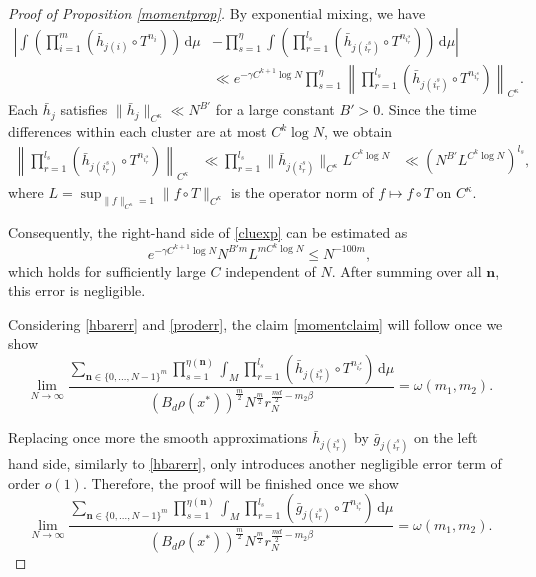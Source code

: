 \documentclass[11pt,twoside,a4paper,reqno]{amsart}
\renewcommand{\d}{\, \text{d}}
\begin{document}
\begin{proof}[Proof of Proposition \ref{momentprop}]
By exponential mixing, we have
\begin{equation}\label{cluexp}
\begin{aligned}
\left|\int \left(\prod_{i=1}^m (\bar{h}_{j(i)} \circ T^{n_i})\right) \d\mu \right.&\left.-\prod_{s=1}^{\eta}\int\left(\prod_{r=1}^{l_s} (\bar{h}_{j(i^s_r)} \circ T^{n_{i^s_r}})\right) \d\mu\right|\\
&\ll e^{-\gamma C^{k+1} \log N}\prod_{s=1}^\eta\left\|\prod_{r=1}^{l_s} (\bar{h}_{j(i^s_r)} \circ T^{n_{i^s_r}})\right\|_{C^{\kappa}}.
\end{aligned}
\end{equation}
Each $\bar{h}_j$ satisfies $\|\bar{h}_j\|_{C^{\kappa}} \ll N^{B'}$ for a large constant $B'>0$. Since the time differences within each cluster are at most $C^k \log N$, we obtain
\begin{align*}
\left\|\prod_{r=1}^{l_s} (\bar{h}_{j(i^s_r)} \circ T^{n_{i^s_r}})\right\|_{C^{\kappa}} &\ll\prod_{r=1}^{l_s} \| \bar{h}_{j(i^s_r)} \|_{C^{\kappa}} L^{C^k \log N}&\ll\left(N^{B'} L^{C^k \log N}\right)^{l_s},
\end{align*}
where $L=\sup_{\|f\|_{C^{\kappa}}=1} \|f\circ T\|_{C^{\kappa}}$ is the operator norm of $f\mapsto f\circ T$ on $C^{\kappa}$.

Consequently, the right-hand side of \eqref{cluexp} can be estimated as
\begin{equation}\label{proderr}
e^{-\gamma C^{k+1}\log N}N^{B'm}L^{mC^k\log N}\le N^{-100m},
\end{equation}
which holds for sufficiently large $C$ independent of $N.$ After summing over all $\mathbf n$, this error is negligible.




Considering \eqref{hbarerr} and \eqref{proderr}, the claim \eqref{momentclaim} will follow once we show
\begin{equation*}
\lim_{N\rightarrow \infty} \frac{\sum_{\textbf{n}\in \{0,\ldots,N-1\}^m} \prod_{s=1}^{\eta(\textbf{n})} \int_M \prod_{r=1}^{l_s} (\bar{h}_{j(i^s_r)} \circ T^{n_{i^s_r}}) \d\mu}{\left(B_d \rho(x^*)\right)^{\frac{m}{2}} N^{\frac{m}{2}} r_N^{\frac{md}{2}-m_2\beta }} = \omega(m_1,m_2).
\end{equation*}

Replacing once more the smooth approximations $\bar{h}_{j(i^s_r)}$ by $\bar{g}_{j(i^s_r)}$ on the left hand side, similarly to \eqref{hbarerr}, only introduces another negligible error term of order $o(1)$. Therefore, the proof will be finished once we show
\begin{equation}\label{momentsumclaim}
\lim_{N\rightarrow \infty} \frac{\sum_{\textbf{n}\in \{0,\ldots,N-1\}^m} \prod_{s=1}^{\eta(\textbf{n})} \int_M \prod_{r=1}^{l_s} (\bar{g}_{j(i^s_r)} \circ T^{n_{i^s_r}})\d\mu}{\left(B_d \rho(x^*)\right)^{\frac{m}{2}} N^{\frac{m}{2}} r_N^{\frac{md}{2}-m_2\beta }} = \omega(m_1,m_2).
\end{equation}


\end{proof}
\end{document}
